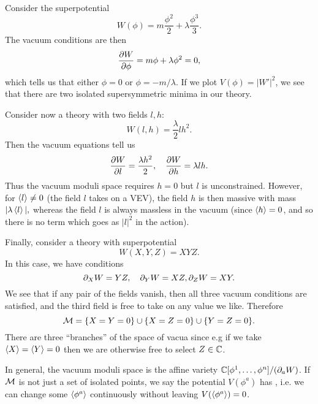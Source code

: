 \begin{exm}
    Consider the superpotential
    \begin{equation}
        W(\phi)=m\frac{\phi^2}{2}+\lambda \frac{\phi^3}{3}.
    \end{equation}
    The vacuum conditions are then
    \begin{equation}
        \P{W}{\phi}=m \phi + \lambda \phi^2=0,
    \end{equation}
    which tells us that either $\phi=0$ or $\phi=-m/\lambda$. If we plot $V(\phi)=|W'|^2$, we see that there are two isolated supersymmetric minima in our theory.
\end{exm}
\begin{exm}
    Consider now a theory with two fields $l,h$:
    \begin{equation}
        W(l,h)=\frac{\lambda}{2} lh^2.
    \end{equation}
    Then the vacuum equations tell us
    \begin{equation}
        \P{W}{l}=\frac{\lambda h^2}{2},\quad \P{W}{h}=\lambda l h.
    \end{equation}
    Thus the vacuum moduli space requires $h=0$ but $l$ is unconstrained. However, for $\avg{l}\neq 0$ (the field $l$ takes on a VEV), the field $h$ is then massive with mass $|\lambda \avg{l}|,$ whereas the field $l$ is always massless in the vacuum (since $\avg{h}=0$, and so there is no term which goes as $|l|^2$ in the action).
\end{exm}
\begin{exm}
    Finally, consider a theory with superpotential
    \begin{equation}
        W(X,Y,Z)=XYZ.
    \end{equation}
    In this case, we have conditions
    \begin{equation}
        \p_X W=YZ,\quad \p_Y W =XZ, \p_Z W=XY.
    \end{equation}
    We see that if any pair of the fields vanish, then all three vacuum conditions are satisfied, and the third field is free to take on any value we like. Therefore
    \begin{equation}
        \cM=\set{X=Y=0} \cup \set{X=Z=0} \cup \set{Y=Z=0}.
    \end{equation}
    There are three ``branches'' of the space of vacua since e.g if we take $\avg{X}=\avg{Y}=0$ then we are otherwise free to select $Z\in \CC$.
\end{exm}
In general, the vacuum moduli space is the affine variety
$\CC[\phi^1,\ldots,\phi^n]/(\p_a W)$. If $\cM$ is not just a set of isolated points, we say the potential $V(\phi^a)$ has , i.e. we can change some $\avg{\phi^a}$ continuously without leaving $V(\avg{\phi^a})=0$.

